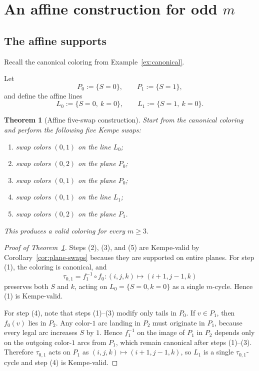 \documentclass[11pt]{article}
\newtheorem{theorem}{Theorem}
\begin{document}
\section{An affine construction for odd $m$}\label{sec:affine}

\subsection{The affine supports}
Recall the canonical coloring from Example~\ref{ex:canonical}.

Let
\[
P_0:=\{S=0\},\qquad P_1:=\{S=1\},
\]
and define the affine lines
\[
L_0:=\{S=0,\ k=0\},\qquad L_1:=\{S=1,\ k=0\}.
\]

\begin{theorem}[Affine five-swap construction]\label{thm:5swap}
Start from the canonical coloring and perform the following five Kempe swaps:
\begin{enumerate}[leftmargin=2.2em]
\item swap colors $(0,1)$ on the line $L_0$;
\item swap colors $(0,2)$ on the plane $P_0$;
\item swap colors $(0,1)$ on the plane $P_0$;
\item swap colors $(0,1)$ on the line $L_1$;
\item swap colors $(0,2)$ on the plane $P_1$.
\end{enumerate}
This produces a valid coloring for every $m\ge 3$.
\end{theorem}

\begin{proof}[Proof of Theorem~\ref{thm:5swap}]
Steps (2), (3), and (5) are Kempe-valid by Corollary~\ref{cor:plane-swaps} because they are supported on entire planes.
For step (1), the coloring is canonical, and
\[
\tau_{0,1}=f_1^{-1}\circ f_0:(i,j,k)\mapsto(i+1,j-1,k)
\]
preserves both $S$ and $k$, acting on $L_0=\{S=0,k=0\}$ as a single $m$-cycle.
Hence (1) is Kempe-valid.

For step (4), note that steps (1)--(3) modify only tails in $P_0$.
If $v\in P_1$, then $f_0(v)$ lies in $P_2$.
Any color-$1$ arc landing in $P_2$ must originate in $P_1$, because every legal arc increases $S$ by $1$.
Hence $f_1^{-1}$ on the image of $P_1$ in $P_2$ depends only on the outgoing color-$1$ arcs from $P_1$, which remain canonical after steps (1)--(3).
Therefore $\tau_{0,1}$ acts on $P_1$ as $(i,j,k)\mapsto(i+1,j-1,k)$, so $L_1$ is a single $\tau_{0,1}$-cycle and step (4) is Kempe-valid.
\end{proof}
\end{document}
